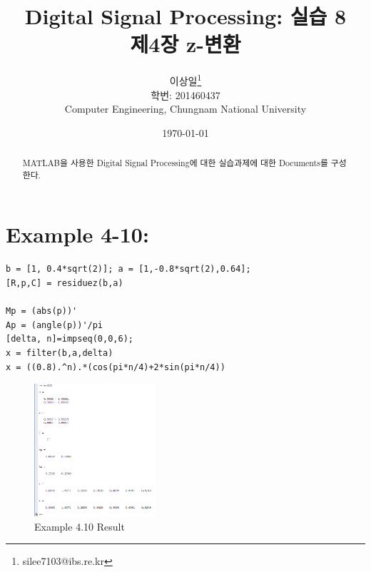 \documentclass[11pt
  , a4paper
  , article
  , oneside
]{memoir}
\begin{document}
\newcommand{\technumber}{
  Digital Signal Processing using MATLAB\\
  Document 1: 2016-03-26}
\title{\textbf{Digital Signal Processing: 실습 8 \\
		제4장 z-변환 \\}}

\author{이상일\thanks{silee7103@ibs.re.kr} \\

  학번: 201460437\\
  Computer Engineering, Chungnam National University 
}
\date{\today}

\renewcommand{\maketitlehooka}{\begin{flushright}\textsf{\technumber}\end{flushright}}

\maketitle

\begin{abstract}
MATLAB을 사용한 Digital Signal Processing에 대한 실습과제에 대한 Documents를 구성한다.
\end{abstract}

\chapter{Example 4-10:}

\begin{lstlisting}[style=termstyle]
%Example 4-10
b = [1, 0.4*sqrt(2)]; a = [1,-0.8*sqrt(2),0.64];
[R,p,C] = residuez(b,a)

Mp = (abs(p))'
Ap = (angle(p))'/pi
[delta, n]=impseq(0,0,6);
x = filter(b,a,delta)
x = ((0.8).^n).*(cos(pi*n/4)+2*sin(pi*n/4))\end{lstlisting}

\begin{figure}[h!]
	\centering
	\includegraphics[width=0.4\textwidth,height=0.15\textwidth]{./images/ex410.png}
	\caption{Example 4.10 Result}
	\label{fig:Example 4.10 Result}
\end{figure}
\end{document}
